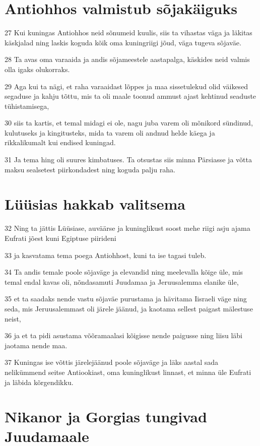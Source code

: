 \section*{Antiohhos valmistub sõjakäiguks}

\par 27 Kui kuningas Antiohhos neid sõnumeid kuulis, siis ta vihastas väga ja läkitas käskjalad ning laskis koguda kõik oma kuningriigi jõud, väga tugeva sõjaväe.
\par 28 Ta avas oma varaaida ja andis sõjameestele aastapalga, käskides neid valmis olla igaks olukorraks.
\par 29 Aga kui ta nägi, et raha varaaidast lõppes ja maa sissetulekud olid väikesed segaduse ja kahju tõttu, mis ta oli maale toonud ammust ajast kehtinud seaduste tühistamisega,
\par 30 siis ta kartis, et temal midagi ei ole, nagu juba varem oli mõnikord sündinud, kulutuseks ja kingitusteks, mida ta varem oli andnud helde käega ja rikkalikumalt kui endised kuningad.
\par 31 Ja tema hing oli suures kimbatuses. Ta otsustas siis minna Pärsiasse ja võtta maksu sealsetest piirkondadest ning koguda palju raha. 

\section*{Lüüsias hakkab valitsema}

\par 32 Ning ta jättis Lüüsiase, auväärse ja kuninglikust soost mehe riigi asju ajama Eufrati jõest kuni Egiptuse piirideni
\par 33 ja kasvatama tema poega Antiohhost, kuni ta ise tagasi tuleb.
\par 34 Ta andis temale poole sõjaväge ja elevandid ning meelevalla kõige üle, mis temal endal kavas oli, nõndasamuti Juudamaa ja Jeruusalemma elanike üle,
\par 35 et ta saadaks nende vastu sõjaväe purustama ja hävitama Iisraeli väge ning seda, mis Jeruusalemmast oli järele jäänud, ja kaotama sellest paigast mälestuse neist,
\par 36 ja et ta pidi asustama võõramaalasi kõigisse nende paigusse ning liisu läbi jaotama nende maa.
\par 37 Kuningas ise võttis järelejäänud poole sõjaväge ja läks aastal sada nelikümmend seitse Antiookiast, oma kuninglikust linnast, et minna üle Eufrati ja läbida kõrgendikku. 

\section*{Nikanor ja Gorgias tungivad Juudamaale}

